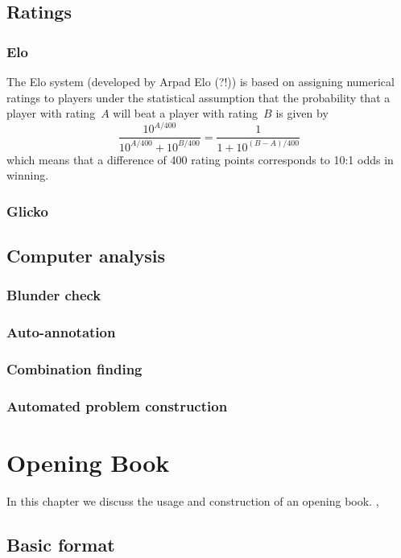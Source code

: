 \documentclass[10pt,dvipdfmx,letterpaper]{report}
\begin{document}
\section{Ratings}
\subsection{Elo}
The Elo system (developed by Arpad Elo (?!)) is based on assigning numerical ratings to
players under the statistical assumption that the probability that a player with rating~$A$
will beat a player with rating~$B$ is given by
\[ \frac{10^{A/400}}{10^{A/400} + 10^{B/400}} = \frac{1}{1 + 10^{(B-A)/400}} \]
which means that a difference of 400 rating points corresponds to 10:1 odds in winning.

\subsection{Glicko}

\section{Computer analysis}
\subsection{Blunder check}
\subsection{Auto-annotation}
\subsection{Combination finding}
\subsection{Automated problem construction}

\chapter{Opening Book}
\label{chap-opening}

In this chapter we discuss the usage and construction of an opening book.
\cite{buro}, \cite{donningerlorenz}

\section{Basic format}
\end{document}
